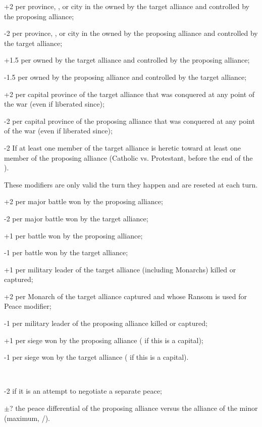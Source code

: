 \begin{modlist}
\item[+2] per province, \TP\faceplus, \COL or city in the \ROTW owned by the
  target alliance and controlled by the proposing alliance;
\item[-2] per province, \TP\faceplus, \COL or city in the \ROTW owned by the
  proposing alliance and controlled by the target alliance;
\item[+1.5] per \TP\facemoins owned by the target alliance and controlled by
  the proposing alliance;
\item[-1.5] per \TP\facemoins owned by the proposing alliance and controlled
  by the target alliance;
\item[+2] per capital province of the target alliance that was conquered at
  any point of the war (even if liberated since);
\item[-2] per capital province of the proposing alliance that was conquered at
  any point of the war (even if liberated since);
\item[-2] If at least one member of the target alliance is heretic toward at
  least one member of the proposing alliance (Catholic vs. Protestant, before
  the end of the ).
\end{modlist}
 These modifiers are only valid the turn
they happen and are reseted at each turn.
\begin{modlist}
\item[+2] per major battle won by the proposing alliance;
\item[-2] per major battle won by the target alliance;
\item[+1] per battle won by the proposing alliance;
\item[-1] per battle won by the target alliance;
\item[+1] per military leader of the target alliance (including Monarchs)
  killed or captured;
\item[+2] per Monarch of the target alliance captured and whose Ransom is used
  for Peace modifier;
\item[-1] per military leader of the proposing alliance killed or captured;
\item[+1] per siege won by the proposing alliance ( if this is a
  capital);
\item[-1] per siege won by the target alliance ( if this is a
  capital).
\end{modlist}
~
\begin{modlist}
\item[-2] if it is an attempt to negotiate a separate peace;
\item[$\pm$?] the peace differential of the proposing alliance versus the
  alliance of the minor (maximum, /).
\end{modlist}

